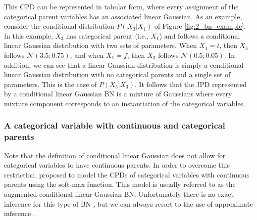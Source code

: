 This CPD can be represented in tabular form, where every assignment of the categorical parent variables has an associated linear Gaussian. As an example, consider the conditional distribution $P(X_{3} | X_{1})$ of Figure \ref{fig:2_bn_example}. In this example, $X_{3}$ has categorical parent (i.e., $X_{1}$) and follows a conditional linear Gaussian distribution with two sets of parameters. When $X_{1} = t$, then $X_{3}$ follows $\mathcal{N}(3.5;0.75)$, and when $X_{1} = f$, then $X_{3}$ follows $\mathcal{N}(0.5; 0.05)$. In addition, we can see that a linear Gaussian distribution is simply a conditional linear Gaussian distribution with no categorical parents and a single set of parameters. This is the case of $P(X_{5} | X_{3})$. It follows that the JPD represented by a conditional linear Gaussian BN is a mixture of Gaussians where every mixture component corresponds to an instantiation of the categorical variables.

\subsubsection*{A categorical variable with continuous and categorical parents}
Note that the definition of conditional linear Gaussian does not allow for categorical variables to have continuous parents. In order to overcome this restriction, \cite{koller1999} proposed to model the CPDs of categorical variables with continuous parents using the soft-max function. This model is usually referred to as the augmented conditional linear Gaussian BN. Unfortunately there is no exact inference for this type of BN \citep{lerner2001}, but we can always resort to the use of approximate inference \citep{murphy1999}.


